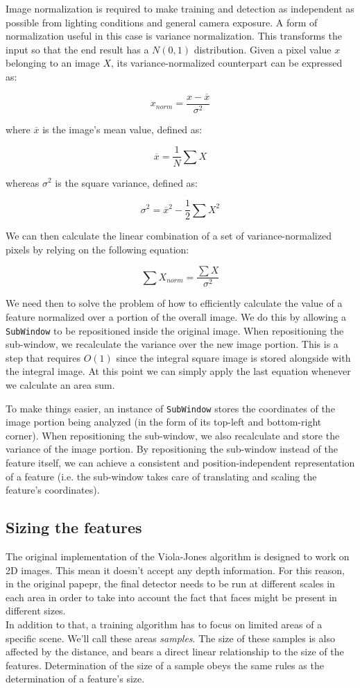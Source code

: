 \documentclass[a4paper,11pt,titlepage]{article}
\begin{document}
Image normalization is required to make training and detection as independent as
possible from lighting conditions and general camera exposure. A form of
normalization useful in this case is variance normalization. This transforms the
input so that the end result has a $N(0,1)$ distribution.
Given a pixel value $x$ belonging to an image $X$, its variance-normalized
counterpart can be expressed as:

\[ x_{norm} = \dfrac{x - \overline{x}}{\sigma^{2}} \]

where $\overline{x}$ is the image's mean value, defined as:

\[ \overline{x} = \dfrac{1}{N} \sum X \]

whereas $\sigma^{2}$ is the square variance, defined as:

\[ \sigma^{2} = \overline{x}^{2} - \dfrac{1}{2} \sum X^{2} \]

We can then calculate the linear combination of a set of variance-normalized
pixels by relying on the following equation:

\[ \sum X_{norm} = \dfrac{\sum X}{\sigma^{2}} \]

We need then to solve the problem of how to efficiently calculate the value of a
feature normalized over a portion of the overall image. We do this by allowing a
\texttt{SubWindow} to be repositioned inside the original image. When
repositioning the sub-window, we recalculate the variance over the new image
portion. This is a step that requires $O(1)$ since the integral square image is
stored alongside with the integral image. At this point we can simply apply the
last equation whenever we calculate an area sum.

To make things easier, an instance of \texttt{SubWindow} stores the coordinates
of the image portion being analyzed (in the form of its top-left and
bottom-right corner). When repositioning the sub-window, we also recalculate and
store the variance of the image portion. By repositioning the sub-window instead
of the feature itself, we can achieve a consistent and position-independent
representation of a feature (i.e. the sub-window takes care of translating and
scaling the feature's coordinates).

\subsection{Sizing the features}
The original implementation of the Viola-Jones algorithm is designed to work on
2D images. This mean it doesn't accept any depth information. For this reason,
in the original papepr, the final detector needs to be run at different scales
in each area in order to take into account the fact that faces might be present
in different sizes. \\
In addition to that, a training algorithm has to focus on limited areas of a
specific scene. We'll call these areas \emph{samples}. The size of these samples
is also affected by the distance, and bears a direct linear relationship to the
size of the features. Determination of the size of a sample obeys the same rules
as the determination of a feature's size.
\end{document}
